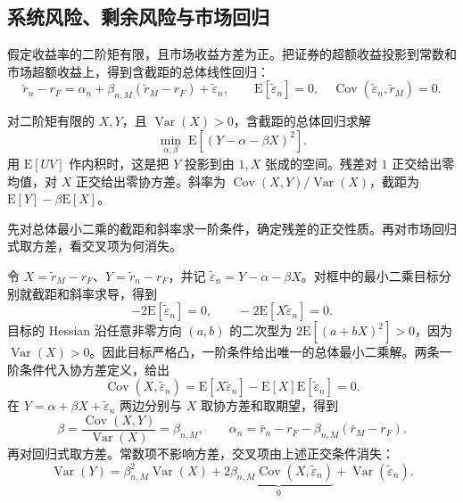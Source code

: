 \subsection{系统风险、剩余风险与市场回归}
假定收益率的二阶矩有限，且市场收益方差为正。把证券的超额收益投影到常数和市场超额收益上，得到含截距的总体线性回归：
\begin{equation}
 \widetilde r_n-r_F=\alpha_n+\beta_{n,M}(\widetilde r_M-r_F)+\widetilde\varepsilon_n,
 \qquad \mathrm E[\widetilde\varepsilon_n]=0,
 \quad\operatorname{Cov}(\widetilde\varepsilon_n,\widetilde r_M)=0.
 \label{eq:wj-13-4}
\end{equation}

\begin{tcolorbox}[knowledge,title={总体最小二乘与残差正交}]
对二阶矩有限的 $X,Y$，且 $\operatorname{Var}(X)>0$，含截距的总体回归求解
\[
 \min_{\alpha,\beta}\;\mathrm E[(Y-\alpha-\beta X)^2].
\]
用 $\mathrm E[UV]$ 作内积时，这是把 $Y$ 投影到由 $1,X$ 张成的空间。残差对 $1$ 正交给出零均值，对 $X$ 正交给出零协方差。斜率为 $\operatorname{Cov}(X,Y)/\operatorname{Var}(X)$，截距为 $\mathrm E[Y]-\beta\mathrm E[X]$。
\end{tcolorbox}

先对总体最小二乘的截距和斜率求一阶条件，确定残差的正交性质。再对市场回归式取方差，看交叉项为何消失。

\begin{solution}[label-content={证明（总体回归与方差分解）},blank-type=none]
令 $X=\widetilde r_M-r_F$、$Y=\widetilde r_n-r_F$，并记 $\widetilde\varepsilon_n=Y-\alpha-\beta X$。对框中的最小二乘目标分别就截距和斜率求导，得到
\[
 -2\mathrm E[\widetilde\varepsilon_n]=0,\qquad
 -2\mathrm E[X\widetilde\varepsilon_n]=0.
\]
目标的 Hessian 沿任意非零方向 $(a,b)$ 的二次型为 $2\mathrm E[(a+bX)^2]>0$，因为 $\operatorname{Var}(X)>0$。因此目标严格凸，一阶条件给出唯一的总体最小二乘解。两条一阶条件代入协方差定义，给出
\[
 \operatorname{Cov}(X,\widetilde\varepsilon_n)
 =\mathrm E[X\widetilde\varepsilon_n]-\mathrm E[X]\mathrm E[\widetilde\varepsilon_n]=0.
\]
在 $Y=\alpha+\beta X+\widetilde\varepsilon_n$ 两边分别与 $X$ 取协方差和取期望，得到
\[
 \beta=\frac{\operatorname{Cov}(X,Y)}{\operatorname{Var}(X)}=\beta_{n,M},
 \qquad \alpha_n=\bar r_n-r_F-\beta_{n,M}(\bar r_M-r_F).
\]
再对回归式取方差。常数项不影响方差，交叉项由上述正交条件消失：
\[
 \operatorname{Var}(Y)
 =\beta_{n,M}^2\operatorname{Var}(X)
 +\underbrace{2\beta_{n,M}\operatorname{Cov}(X,\widetilde\varepsilon_n)}_{0}
 +\operatorname{Var}(\widetilde\varepsilon_n).
\]
\end{solution}


